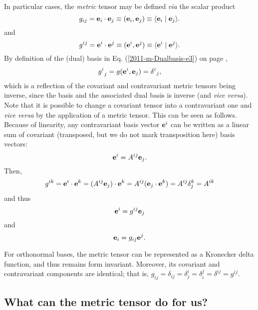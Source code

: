 In particular cases, the {\em metric} tensor may be defined {\it via}  the scalar product
\begin{equation}
g_{ij}={\bf e}_i\cdot {\bf e}_j\equiv ({\bf e}_i, {\bf e}_j)\equiv \langle {\bf e}_i \mid {\bf e}_j\rangle .
\end{equation}
and
\begin{equation}
g^{ij}={\bf e}^i\cdot {\bf e}^j\equiv ({\bf e}^i, {\bf e}^j)\equiv \langle {\bf e}^i \mid {\bf e}^j\rangle .
\end{equation}
By definition of the (dual) basis in Eq. (\ref{2011-m-Dualbasis-e3}) on page \pageref{2011-m-Dualbasis-e3},
\begin{equation}
{g^i}_{j}
= g({\bf e}^i , {\bf e}_j)
={\delta^i}_j ,
\label{2014-m-ch-tensor-deltag}
\end{equation}
which is a reflection of the covariant and contravariant metric tensors being inverse,
since the basis and the associated dual basis is inverse (and {\it vice versa}).
Note that it is possible to change a covariant tensor into a contravariant one and {\em vice versa}
by the application of a metric tensor.
This can be seen as follows.
Because of linearity, any contravariant basis vector ${\bf e}^i$
can be written as a linear sum of covariant (transposed, but we do not mark transposition here) basis vectors:
\begin{equation}
{\bf e}^i=A^{ij}{\bf e}_j.
\end{equation}
Then,
\begin{equation}
g^{ik} ={\bf e}^i\cdot {\bf e}^k =(A^{ij}{\bf e}_j)\cdot {\bf e}^k=A^{ij}({\bf e}_j\cdot {\bf e}^k)=A^{ij}\delta_j^k=A^{ik}
\end{equation}
and thus
\begin{equation}
{\bf e}^i=g^{ij}{\bf e}_j
\end{equation}
and
\begin{equation}
{\bf e}_i=g_{ij}{\bf e}^j.
\end{equation}


For orthonormal bases, the metric tensor can be
represented as a Kronecker delta function, and thus  remains form invariant.
Moreover, its covariant and contravariant components are identical; that is,
$g_{ij}=\delta_{ij}=\delta^i_j=\delta_i^j=\delta^{ij}=g^{ij}$.



\subsection{What can the metric tensor do for us?}

